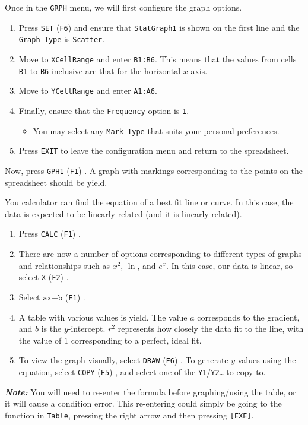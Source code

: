 \documentclass[a5paper]{memoir}
\def\code#1{\texttt{#1}}
\def\note#1{\textcolor[HTML]{109fa9}{\textbf{\textit{Note:}}} #1}
\def\Fone{(\code{F1}) }
\def\Ftwo{(\code{F2}) }
\def\Ffive{(\code{F5}) }
\def\Fsix{(\code{F6}) }
\begin{document}
Once in the \code{GRPH} menu, we will first configure the graph options. 
\begin{enumerate}
	\item Press \code{SET} \Fsix and ensure that \code{StatGraph1} is shown on the first line and the \code{Graph Type} is \code{Scatter}.
	\item Move to \code{XCellRange} and enter \code{B1:B6}. This means that the values from cells \code{B1} to \code{B6} inclusive are that for the horizontal $x$-axis.
	\item Move to \code{YCellRange} and enter \code{A1:A6}.
	\item Finally, ensure that the \code{Frequency} option is \code{1}.
	\begin{itemize}
		\item You may select any \code{Mark Type} that suits your personal preferences.
	\end{itemize}
	\item Press \code{EXIT} to leave the configuration menu and return to the spreadsheet.
\end{enumerate}

Now, press \code{GPH1} \Fone. A graph with markings corresponding to the points on the spreadsheet should be yield.

You calculator can find the equation of a best fit line or curve. In this case, the data is expected to be linearly related (and it is linearly related).

\begin{enumerate}
	\item Press \code{CALC} \Fone.
	\item There are now a number of options corresponding to different types of graphs and relationships such as $x^2$, $\ln$, and $e^x$. In this case, our data is linear, so select \code{X} \Ftwo.
	\item Select $\code{ax+b}$ \Fone.
	\item A table with various values is yield. The value $a$ corresponds to the gradient, and $b$ is the $y$-intercept. $r^2$ represents how closely the data fit to the line, with the value of $1$ corresponding to a perfect, ideal fit.
	\item To view the graph visually, select \code{DRAW} \Fsix. To generate $y$-values using the equation, select \code{COPY} \Ffive, and select one of the \code{Y1}/\code{Y2\dots} to copy to.
\end{enumerate}

\note{You will need to re-enter the formula before graphing/using the table, or it will cause a condition error. This re-entering could simply be going to the function in \code{Table}, pressing the right arrow and then pressing \code{[EXE]}.}
\end{document}

